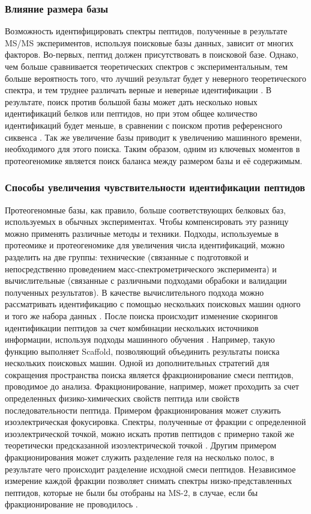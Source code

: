 \subsubsection{Влияние размера базы}
Возможность идентифицировать спектры пептидов, полученные в результате MS/MS экспериментов, используя поисковые базы данных, зависит от многих факторов. Во-первых, пептид должен присутствовать в поисковой базе. Однако, чем больше сравнивается теоретических спектров с экспериментальным, тем больше вероятность того, что лучший результат будет у неверного теоретического спектра, и тем труднее различать верные и неверные идентификации \cite{nesvizhskii2010survey}. В результате, поиск против большой базы может дать несколько новых идентификаций белков или пептидов, но при этом общее количество идентификаций будет меньше, в сравнении с поиском против референсного сиквенса \cite{blakeley2012addressing, krug2013deep}. Так же увеличение базы приводит к увеличению машинного времени, необходимого для этого поиска. Таким образом, одним из ключевых моментов в протеогеномике является поиск баланса между размером базы и её содержимым.

\subsubsection{Способы увеличения чувствительности идентификации пептидов}
Протеогеномные базы, как правило, больше соответствующих белковых баз, используемых в обычных экспериментах. Чтобы компенсировать эту разницу можно применять различные методы и техники. Подходы, используемые в протеомике и протеогеномике для увеличения числа идентификаций, можно разделить на две группы: технические (связанные с подготовкой и непосредственно проведением масс-спектрометрического эксперимента) и вычислительные (связанные с различными подходами обрабоки и валидации полученных результатов). В качестве вычислительного подхода можно рассматривать идентификацию с помощью нескольких поисковых машин одного и того же набора данных \cite{shteynberg2013combining}. После поиска происходит изменение скорингов идентификации пептидов за счет комбинации нескольких источников информации, используя подходы машинного обучения \cite{nesvizhskii2010survey}. Например, такую функцию выполняет Scaffold, позволяющий объединить результаты поиска нескольких поисковых машин. Одной из дополнительных стратегий для сокращения пространства поиска является фракционирование смеси пептидов, проводимое до  анализа. Фракционирование, например, может проходить за счет определенных физико-химических свойств пептида или свойств последовательности пептида. Примером фракционирования может служить изоэлектрическая фокусировка. Спектры, полученные от фракции с определенной изоэлектрической точкой, можно искать против пептидов с примерно такой же теоретически предсказанной изоэлектрической точкой \cite{branca2014hirief}. Другим примером фракционирования может служить разделение геля на несколько полос, в результате чего происходит разделение исходной смеси пептидов. Независимое измерение каждой фракции позволяет снимать спектры низко-представленных пептидов, которые не были бы отобраны на MS-2, в случае, если бы фракционирование не проводилось \cite{bespyatykh2016proteome}.

